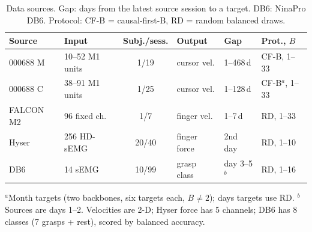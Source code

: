 \begin{table}[t]
\caption{Data sources. Gap: days from the latest source session to a target.
DB6: NinaPro DB6. Protocol: CF-B = causal-first-B, RD = random balanced draws.}
\label{tab:datasets}
\centering
\scriptsize
\setlength{\tabcolsep}{2.5pt}
\begin{tabular}{@{}llclll@{}}
\toprule
Source & Input & Subj./sess. & Output & Gap & Prot., $B$ \\
\midrule
000688 M  & 10--52 M1 units & 1/19  & cursor vel.  & 1--468\,d & CF-B, 1--33 \\
000688 C  & 38--91 M1 units & 1/25  & cursor vel.  & 1--128\,d & CF-B$^{a}$, 1--33 \\
FALCON M2 & 96 fixed ch.    & 1/7   & finger vel.  & 1--7\,d   & RD, 1--33 \\
Hyser     & 256 HD-sEMG     & 20/40 & finger force & 2nd day   & RD, 1--10 \\
DB6       & 14 sEMG         & 10/99 & grasp class  & day 3--5$^{b}$ & RD, 1--16 \\
\bottomrule
\end{tabular}

\vspace{2pt}
\parbox{\columnwidth}{\scriptsize
$^{a}$Month targets (two backbones, six targets each, $B \ne 2$); days targets use RD.
$^{b}$Sources are days 1--2. Velocities are 2-D; Hyser force has 5 channels;
DB6 has 8 classes (7 grasps + rest), scored by balanced accuracy.}
\end{table}
